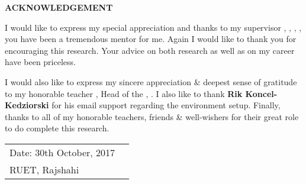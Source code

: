 \documentclass[document.tex]{subfiles}
\begin{document}

\begin{center}
\textbf{{\fontsize{16pt}{0.5cm}\selectfont ACKNOWLEDGEMENT}}
\vspace{1cm}
\end{center}

\noindent I would like to express my special appreciation and thanks to my supervisor \textbf{\thesissupervisor}, \thesissupervisordesignation, \deptT, \ruet, you have been a tremendous mentor for me. Again I would like to thank you for encouraging this research. Your advice on both research as well as on my career have been priceless. 

\noindent I would also like to express my sincere appreciation \& deepest sense of gratitude to my honorable teacher \textbf{\depthead}, Head of the \deptT, \ruet.
\noindent I also like to thank \textbf{Rik Koncel-Kedziorski} for his email support regarding the environment setup.
\noindent Finally, thanks to all of my honorable teachers, friends \& well-wishers for their great role to do complete this research.

\vfill
\noindent 
\begin{tabularx}{\textwidth}{X X}
  {\fontsize{14pt}{0.5cm}\selectfont Date: 30th October, 2017} & \raggedleft { \fontsize{14pt}{0.5cm}\selectfont \authorname }\tabularnewline
{\fontsize{14pt}{0.5cm}\selectfont RUET, Rajshahi} & \tabularnewline
\end{tabularx}



\clearpage
\end{document}
